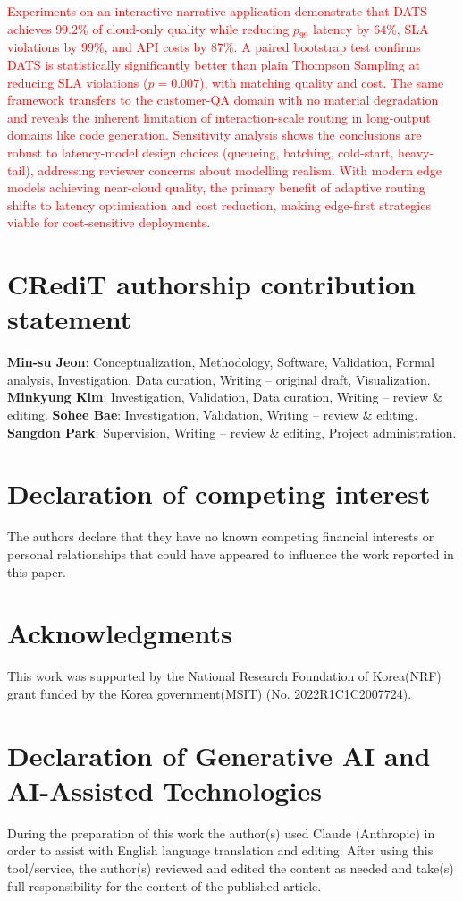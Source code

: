 \documentclass[final,3p,twocolumn,authoryear]{elsarticle}
\newcommand{\rev}[1]{\textcolor{red}{#1}}
\theoremstyle{plain}
\theoremstyle{definition}
\begin{document}
\rev{Experiments on an interactive narrative application demonstrate that DATS achieves $99.2\%$ of cloud-only quality while reducing $p_{99}$ latency by $64\%$, SLA violations by $99\%$, and API costs by $87\%$.
A paired bootstrap test confirms DATS is statistically significantly better than plain Thompson Sampling at reducing SLA violations ($p{=}0.007$), with matching quality and cost.
The same framework transfers to the customer-QA domain with no material degradation and reveals the inherent limitation of interaction-scale routing in long-output domains like code generation.
Sensitivity analysis shows the conclusions are robust to latency-model design choices (queueing, batching, cold-start, heavy-tail), addressing reviewer concerns about modelling realism.}
\rev{With modern edge models achieving near-cloud quality, the primary benefit of adaptive routing shifts to latency optimisation and cost reduction, making edge-first strategies viable for cost-sensitive deployments.}

\section*{CRediT authorship contribution statement}

\textbf{Min-su Jeon}: Conceptualization, Methodology, Software, Validation, Formal analysis, Investigation, Data curation, Writing -- original draft, Visualization.
\textbf{Minkyung Kim}: Investigation, Validation, Data curation, Writing -- review \& editing.
\textbf{Sohee Bae}: Investigation, Validation, Writing -- review \& editing.
\textbf{Sangdon Park}: Supervision, Writing -- review \& editing, Project administration.

\section*{Declaration of competing interest}

The authors declare that they have no known competing financial interests or personal relationships that could have appeared to influence the work reported in this paper.

\section*{Acknowledgments}

This work was supported by the National Research Foundation of Korea(NRF) grant funded by the Korea government(MSIT) (No. 2022R1C1C2007724).

\section*{Declaration of Generative AI and AI-Assisted Technologies}

During the preparation of this work the author(s) used Claude (Anthropic) in order to assist with English language translation and editing. After using this tool/service, the author(s) reviewed and edited the content as needed and take(s) full responsibility for the content of the published article.

\begingroup
\setlength{\bibsep}{0pt}


\endgroup
\end{document}
